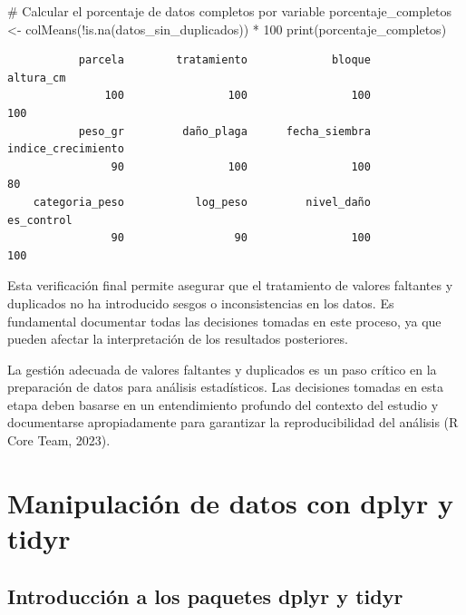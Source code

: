 \documentclass[
  spanish,
  a4paper,
  DIV=11,
  numbers=noendperiod,
  onepage,
  openany]{scrreprt}
\newenvironment{Shaded}{\begin{snugshade}}{\end{snugshade}}
\newcommand{\CommentTok}[1]{\textcolor[rgb]{0.37,0.37,0.37}{#1}}
\newcommand{\DecValTok}[1]{\textcolor[rgb]{0.68,0.00,0.00}{#1}}
\newcommand{\FunctionTok}[1]{\textcolor[rgb]{0.28,0.35,0.67}{#1}}
\newcommand{\NormalTok}[1]{\textcolor[rgb]{0.00,0.23,0.31}{#1}}
\newcommand{\OtherTok}[1]{\textcolor[rgb]{0.00,0.23,0.31}{#1}}
\newcommand{\SpecialCharTok}[1]{\textcolor[rgb]{0.37,0.37,0.37}{#1}}
\begin{document}
\begin{Shaded}
\begin{Highlighting}[]
\CommentTok{\# Calcular el porcentaje de datos completos por variable}
\NormalTok{porcentaje\_completos }\OtherTok{\textless{}{-}} \FunctionTok{colMeans}\NormalTok{(}\SpecialCharTok{!}\FunctionTok{is.na}\NormalTok{(datos\_sin\_duplicados)) }\SpecialCharTok{*} \DecValTok{100}
\FunctionTok{print}\NormalTok{(porcentaje\_completos)}
\end{Highlighting}
\end{Shaded}

\begin{verbatim}
           parcela        tratamiento             bloque          altura_cm 
               100                100                100                100 
           peso_gr         daño_plaga      fecha_siembra indice_crecimiento 
                90                100                100                 80 
    categoria_peso           log_peso         nivel_daño         es_control 
                90                 90                100                100 
\end{verbatim}

Esta verificación final permite asegurar que el tratamiento de valores
faltantes y duplicados no ha introducido sesgos o inconsistencias en los
datos. Es fundamental documentar todas las decisiones tomadas en este
proceso, ya que pueden afectar la interpretación de los resultados
posteriores.

La gestión adecuada de valores faltantes y duplicados es un paso crítico
en la preparación de datos para análisis estadísticos. Las decisiones
tomadas en esta etapa deben basarse en un entendimiento profundo del
contexto del estudio y documentarse apropiadamente para garantizar la
reproducibilidad del análisis (R Core Team, 2023).


\chapter{Manipulación de datos con dplyr y
tidyr}\label{manipulaciuxf3n-de-datos-con-dplyr-y-tidyr}

\section{Introducción a los paquetes dplyr y
tidyr}\label{introducciuxf3n-a-los-paquetes-dplyr-y-tidyr}
\end{document}
